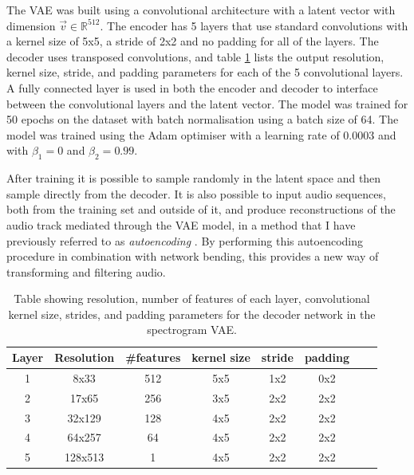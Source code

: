 The VAE was built using a convolutional architecture with a latent vector with dimension $\vec{v} \in \mathbb{R}^{512}$. The encoder has 5 layers that use standard convolutions with a kernel size of 5x5, a stride of 2x2 and no padding for all of the layers. The decoder uses transposed convolutions, and table \ref{tab:c5:decoder-architecture} lists the output resolution, kernel size, stride, and padding parameters for each of the 5 convolutional layers. A fully connected layer is used in both the encoder and decoder to interface between the convolutional layers and the latent vector. The model was trained for 50 epochs on the dataset with batch normalisation using a batch size of 64. The model was trained using the Adam optimiser \citep{kingma2014adam} with a learning rate of 0.0003 and with $\beta_1 = 0$ and $\beta_2 = 0.99$.

After training it is possible to sample randomly in the latent space and then sample directly from the decoder. It is also possible to input audio sequences, both from the training set and outside of it, and produce reconstructions of the audio track mediated through the VAE model, in a method that I have previously referred to as \textit{autoencoding} \citep{broad2017autoencoding}. By performing this autoencoding procedure in combination with network bending, this provides a new way of transforming and filtering audio.

\begin{table}[]
    \centering
    \begin{tabular}{|c|c|c|c|c|c|c|c|}
    \hline
    Layer & Resolution & \#features & kernel size & stride & padding \\
    \hline
    1     & 8x33       & 512        & 5x5         & 1x2     & 0x2  \\
    2     & 17x65      & 256        & 3x5         & 2x2     & 2x2 \\
    3     & 32x129     & 128        & 4x5         & 2x2     & 2x2 \\
    4     & 64x257     & 64         & 4x5         & 2x2     & 2x2  \\
    5     & 128x513    & 1          & 4x5         & 2x2     & 2x2  \\
    \hline
    \end{tabular}
    \medskip
    \caption{\label{tab:c5:decoder-architecture}Table showing resolution, number of features of each layer, convolutional kernel size, strides, and padding parameters for the decoder network in the spectrogram VAE.
    }
    \end{table}

